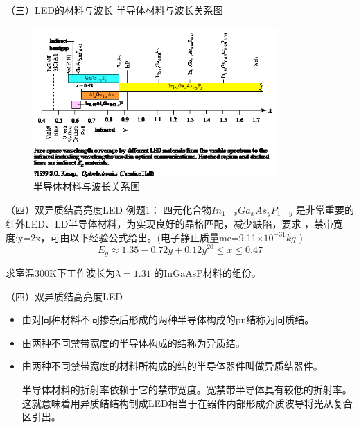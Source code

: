 \documentclass[trans]{beamer} %
\begin{document}
 \begin{frame}{（三）LED的材料与波长}
半导体材料与波长关系图
   
    \begin{figure}[htbp] 
    \centering\includegraphics[height=2.25in]{source/ch2/fg229.png} 
    \caption{半导体材料与波长关系图}
    \end{figure}
 \end{frame}  

 \begin{frame}{（四）双异质结高亮度LED}
 例题1：
四元化合物$In_{1-x}Ga_xAs_yP_{1-y}$
 是非常重要的红外LED、LD半导体材料，为实现良好的晶格匹配，减少缺陷，要求 ，禁带宽度:y=2x，可由以下经验公式给出。(电子静止质量me=9.11×$10^{-31}kg$ )
 $$E_g\approx 1.35-0.72y+0.12y^20\le x \le 0.47$$
 
求室温300K下工作波长为$\lambda=1.31$ 的InGaAsP材料的组份。

 \end{frame}  


 
 \begin{frame}{（四）双异质结高亮度LED}
    \begin{itemize}
        \item  由对同种材料不同掺杂后形成的两种半导体构成的pn结称为同质结。
        \item  由两种不同禁带宽度的半导体构成的结称为异质结。
        \item 由两种不同禁带宽度的材料所构成的结的半导体器件叫做异质结器件。
        
        半导体材料的折射率依赖于它的禁带宽度。宽禁带半导体具有较低的折射率。这就意味着用异质结结构制成LED相当于在器件内部形成介质波导将光从复合区引出。

    \end{itemize}
 \end{frame} 
 
\end{document}
